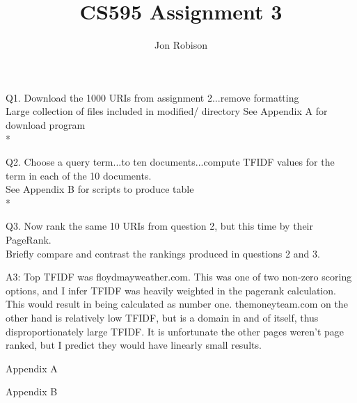 \documentclass{article}
\begin{document}
\author{Jon Robison}
\title{CS595 Assignment 3}
\maketitle

Q1. Download the 1000 URIs from assignment 2...remove formatting \\
Large collection of files included in modified/ directory
See Appendix A for download program
\\*

Q2. Choose a query term...to ten documents...compute TFIDF values for the term
in each of the 10 documents. \\
%
See Appendix B for scripts to produce table
\\*

Q3. Now rank the same 10 URIs from question 2, but this time by their
PageRank. \\
%
Briefly compare and contrast the rankings produced in questions 2
and 3.

A3: Top TFIDF was floydmayweather.com. This was one of two non-zero scoring
options, and I infer TFIDF was heavily weighted in the pagerank calculation.
This would result in being calculated as number one. themoneyteam.com on the
other hand is relatively low TFIDF, but is a domain in and of itself, thus
disproportionately large TFIDF. It is unfortunate the other pages weren't
page ranked, but I predict they would have linearly small results.

\newpage
\appendix
Appendix A
%

\newpage
Appendix B
%
%
%
\end{document}
